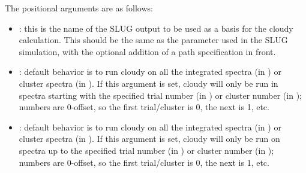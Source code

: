 \documentclass[letterpaper,10pt,english]{sphinxmanual}
\begin{document}
The positional arguments are as follows:
\begin{itemize}
\item {} 
: this is the name of the SLUG output to be used
as a basis for the cloudy calculation. This should be the same as
the  parameter used in the SLUG simulation, with the
optional addition of a path specification in front.

\item {} 
: default behavior is to run cloudy on all the
integrated spectra (in {\hyperref[cloudy:sssec-cloudy-integrated-mode]{\emph{}}}) or
cluster spectra (in {\hyperref[cloudy:sssec-cloudy-cluster-mode]{\emph{}}}). If this
argument is set, cloudy will only be run in spectra starting with
the specified trial number (in {\hyperref[cloudy:sssec-cloudy-integrated-mode]{\emph{}}})
or cluster number (in {\hyperref[cloudy:sssec-cloudy-cluster-mode]{\emph{}}}); numbers are
0-offset, so the first trial/cluster is 0, the next is 1, etc.

\item {} 
: default behavior is to run cloudy on all the
integrated spectra (in {\hyperref[cloudy:sssec-cloudy-integrated-mode]{\emph{}}}) or
cluster spectra (in {\hyperref[cloudy:sssec-cloudy-cluster-mode]{\emph{}}}). If this
argument is set, cloudy will only be run on spectra up to the
specified trial number (in {\hyperref[cloudy:sssec-cloudy-integrated-mode]{\emph{}}}) or
cluster number (in {\hyperref[cloudy:sssec-cloudy-cluster-mode]{\emph{}}}); numbers are
0-offset, so the first trial/cluster is 0, the next is 1, etc.

\end{itemize}
\end{document}
